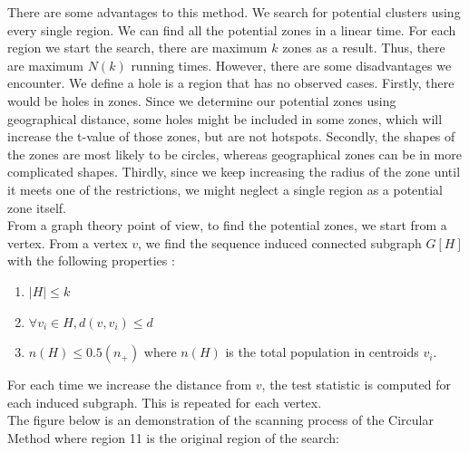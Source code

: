 \documentclass[12pt]{article}
\begin{document}
\begin{enumerate}
			There are some advantages to this method. We search for potential clusters using every single region. We can find all the potential zones in a linear time. For each region we start the search, there are maximum $k$ zones as a result. Thus, there are maximum $N(k)$ running times. However, there are some disadvantages we encounter. We define a hole is a region that has no observed cases. Firstly, there would be holes in zones. Since we determine our potential zones using geographical distance, some holes might be included in some zones, which will increase the t-value of those zones, but are not hotspots. Secondly, the shapes of the zones are most likely to be circles, whereas geographical zones can be in more complicated shapes. Thirdly, since we keep increasing the radius of the zone until it meets one of the restrictions, we might neglect a single region as a potential zone itself. \\  
		From a graph theory point of view, to find the potential zones, we start from a vertex. From a vertex $v$, we find the sequence induced connected subgraph $G[H]$ with the following properties : \\
				\begin{enumerate}
					
					\item $|H| \leq k $ 
					\item $ \forall v_i \in  H, d(v,v_i) \leq d $
					\item $n(H) \leq 0.5(n_+)$ where $n(H)$ is the total population in centroids $v_i$. 
				\end{enumerate}   
				 For each time we increase the distance from $v$, the test statistic is computed for each induced subgraph. This is repeated for each vertex. \\ 
				
	
	The figure below is an demonstration of the scanning process of the Circular Method where region 11 is the original region of the search:\\
	\begin{figure}[!ht]
		

\end{figure}
\end{enumerate}
\end{document}
